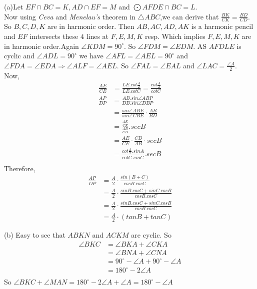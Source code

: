 \documentclass{subfile}
\begin{document}
	\begin{solution}
		(a)Let $EF\cap BC=K,AD\cap EF=M$ and $\bigodot AFDE\cap BC=L$.\\
		Now using \textit{Ceva} and \textit{Menelau's} theorem in $\triangle ABC$,we can derive that $\frac{BK}{CK}=\frac{BD}{CD}$. So $B,C,D,K$ are in harmonic order. Then $AB,AC,AD,AK$ is a harmonic pencil and $EF$ imtersects these $4$ lines at $F,E,M,K$ resp. Which implies $F,E,M,K$ are in harmonic order.Again $\angle KDM=90^{\circ}$. So $\angle FDM=\angle EDM$.
		AS $AFDLE$ is cyclic and $\angle ADL=90^{\circ}$ we have $\angle AFL=\angle AEL=90^{\circ}$ and $\angle FDA=\angle EDA \Rightarrow \angle ALF=\angle AEL$.
		So $\angle FAL=\angle EAL$ and $\angle LAC=\frac{\angle A}{2}$.\\
		Now, 
			\begin{align*}
				\frac{AE}{CE} &=\frac{LE.cot \frac{A}{2}}{LE.cot C}=\frac{cot\frac{A}{2}}{cot C}
			\end{align*}
			\begin{align*}
				\frac{AP}{DP}   & =\frac{AB.sin \angle ABP}{DB.sin \angle DBP}\\
								& =\frac{sin \angle ABE}{sin \angle CBE}\cdot\frac{AB}{BD}\\
								& =\frac{\frac{AE}{CE}}{\frac{AB}{CB}}.sec B\\
								& =\frac{AE}{CE}\cdot\frac{CB}{AB}\cdot sec B\\
								& =\frac{cot\frac{A}{2}.sin A}{cot C.sin C}.sec B\\
			\end{align*}
		Therefore,
			\begin{align*}
				\frac{AP}{DP} & =\frac{A}{2}\cdot\frac{sin(B+C)}{cos B.cos C}\\
							  & =\frac{A}{2}\cdot\frac{sin B.cos C+sin C.cos B}{cos B.cos C}\\ 
							  & =\frac{A}{2}\cdot\frac{sin B.cos C+sin C.cos B}{cos B.cos C}\\
							  & =\frac{A}{2}\cdot(tan B+tan C)
			\end{align*}
		
		(b) Easy to see that $ABKN$ and $ACKM$ are cyclic. 
		So 
		\begin{equation*}
		\begin{aligned}
		\angle BKC & =\angle BKA +\angle CKA\\
		& =\angle BNA +\angle CNA\\
		& =90^{\circ}-\angle A+90^{\circ}-\angle A\\
		& =180^{\circ}-2\angle A\\
		\end{aligned}
		\end{equation*}
		So $\angle BKC+\angle MAN=180^{\circ}-2\angle A+\angle A=180^{\circ}-\angle A$
		
	\end{solution}
	
\end{document}
